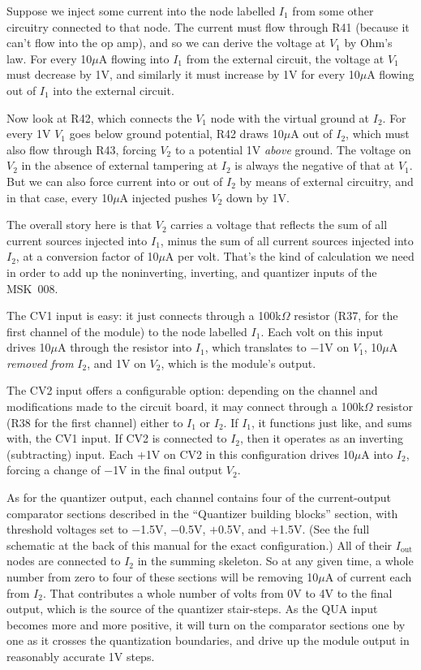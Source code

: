 Suppose we inject some current into the node labelled $I_1$ from some other
circuitry connected to that node.  The current must flow through R41
(because it can't flow into the op amp), and so we can derive the voltage at
$V_1$ by Ohm's law.  For every 10$\mu$A flowing into $I_1$ from the external
circuit, the voltage at $V_1$ must decrease by 1V, and similarly it must
increase by 1V for every 10$\mu$A flowing out of $I_1$ into the external
circuit.

Now look at R42, which connects the $V_1$ node with the virtual ground at
$I_2$.  For every 1V $V_1$ goes below ground potential, R42 draws 10$\mu$A
out of $I_2$, which must also flow through R43, forcing $V_2$ to a potential
1V \emph{above} ground.  The voltage on $V_2$ in the absence of external
tampering at $I_2$ is always the negative of that at $V_1$.  But we can also
force current into or out of $I_2$ by means of external circuitry, and in
that case, every 10$\mu$A injected pushes $V_2$ down by 1V.

The overall story here is that $V_2$ carries a voltage that reflects the sum
of all current sources injected into $I_1$, minus the sum of all current
sources injected into $I_2$, at a conversion factor of 10$\mu$A per volt. 
That's the kind of calculation we need in order to add up the noninverting,
inverting, and quantizer inputs of the MSK~008.

The CV1 input is easy:  it just connects through a 100k$\Omega$ resistor
(R37, for the first channel of the module) to the node labelled $I_1$.  Each
volt on this input drives 10$\mu$A through the resistor into $I_1$, which
translates to $-$1V on $V_1$, 10$\mu$A \emph{removed from} $I_2$, and 1V on
$V_2$, which is the module's output.

The CV2 input offers a configurable option:  depending on the channel and
modifications made to the circuit board, it may connect through a
100k$\Omega$ resistor (R38 for the first channel) either to $I_1$ or $I_2$. 
If $I_1$, it functions just like, and sums with, the CV1 input.  If CV2 is
connected to $I_2$, then it operates as an inverting (subtracting) input. 
Each $+$1V on CV2 in this configuration drives 10$\mu$A into $I_2$,
forcing a change of $-$1V in the final output $V_2$.

As for the quantizer output, each channel contains four of the
current-output comparator sections described in the ``Quantizer building
blocks'' section, with threshold voltages set to $-$1.5V, $-$0.5V, $+$0.5V,
and $+$1.5V.  (See the full schematic at the back of this manual for
the exact configuration.) All of their $I_\textrm{out}$ nodes are connected
to $I_2$ in the summing skeleton.  So at any given time, a whole number from
zero to four of these sections will be removing 10$\mu$A of current each
from $I_2$.  That contributes a whole number of volts from 0V to 4V to the
final output, which is the source of the quantizer stair-steps.  As the QUA
input becomes more and more positive, it will turn on the comparator
sections one by one as it crosses the quantization boundaries, and drive up
the module output in reasonably accurate 1V steps.

